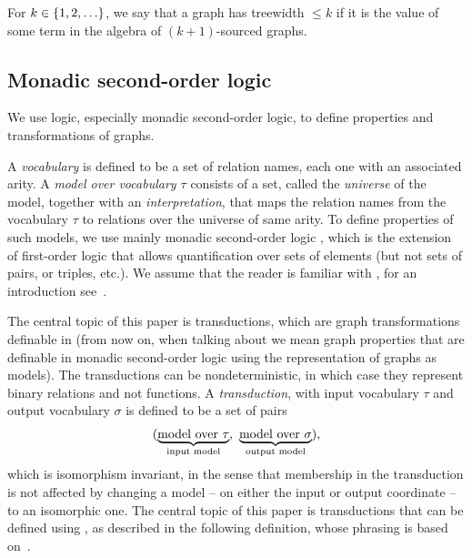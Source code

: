   \begin{definition}[Treewidth]
        For $k \in \{1,2,\ldots\}$, we say that a  graph has treewidth  $\le  k$ if it is the value of some term in the algebra of $(k+1)$-sourced graphs.
    \end{definition}

  
    

    \subsection{Monadic second-order logic}
    We  use logic, especially monadic second-order logic, to define properties and transformations of graphs. 

    A  \emph{vocabulary} is defined to be  a set of relation names, each one with an associated arity. A \emph{model over vocabulary $\tau$} consists of a set, called the \emph{universe} of the model, together with an \emph{interpretation}, that maps the relation names from the vocabulary $\tau$ to  relations over the universe of same arity. To define properties of such models, we use mainly monadic second-order logic \mso, which  is the extension of first-order logic that allows quantification over sets of elements (but not sets of pairs, or triples, etc.). We assume that the reader is familiar with \mso, for an introduction see~\cite[Section 2]{Thomas97}.
     
     
 The central topic of this paper is \mso transductions, which are graph transformations definable in \mso (from now on, when talking about \mso we mean graph properties that are definable in monadic second-order logic using the \msotwo representation of graphs as models). The transductions can be nondeterministic, in which case they represent binary relations and not functions.
A \emph{transduction}, with input vocabulary $\tau$ and output vocabulary $\sigma$ is defined to be a set of pairs 
\begin{align*}
    (\myunderbrace{\text{model over $\tau$}}{input model}, \ 
    \myunderbrace{\text{model over $\sigma$}}{output model}),
\end{align*}
which is isomorphism invariant, in the sense that membership in the transduction is not affected by changing a model -- on either the input or output coordinate -- to an isomorphic one. The central topic of this paper is transductions that can be defined using \mso, as described in the following definition, whose phrasing is based on~\cite[p.~9--10]{bojanczykOptimizingTreeDecompositions2017a}. 

